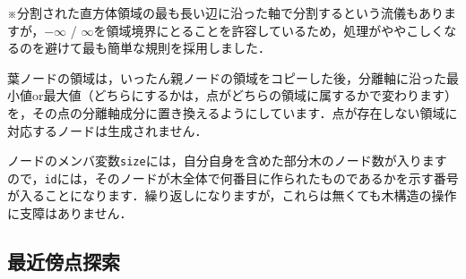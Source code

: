 ﻿\documentclass[a4paper]{jsarticle}
\begin{document}
※分割された直方体領域の最も長い辺に沿った軸で分割するという流儀もありますが，$-\infty$ / $\infty$を領域境界にとることを許容しているため，処理がややこしくなるのを避けて最も簡単な規則を採用しました．

葉ノードの領域は，いったん親ノードの領域をコピーした後，分離軸に沿った最小値or最大値（どちらにするかは，点がどちらの領域に属するかで変わります）を，その点の分離軸成分に置き換えるようにしています．点が存在しない領域に対応するノードは生成されません．

ノードのメンバ変数\verb|size|には，自分自身を含めた部分木のノード数が入りますので，\verb|id|には，そのノードが木全体で何番目に作られたものであるかを示す番号が入ることになります．繰り返しになりますが，これらは無くても木構造の操作に支障はありません．


\subsection{最近傍点探索}
\end{document}
